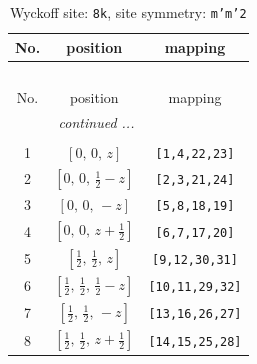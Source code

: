 \documentclass[fleqn,8pt]{jsarticle}
\begin{document}
\begin{longtable}{ccc}
\caption{Wyckoff site: {\tt 8k}, site symmetry: {\tt m'm'2}}
 \\
 \hline \hline
No. & position & mapping \\ \hline \endfirsthead

\multicolumn{2}{l}{\tablename\ \thetable{}} \\
 \hline \hline
No. & position & mapping \\ \hline \endhead

 \hline \hline
\multicolumn{2}{r}{\footnotesize\it continued ...} \\ \endfoot

 \hline \hline
\multicolumn{2}{r}{} \\ \endlastfoot

1 & $\left[ 0,\, 0,\, z \right]$ & {\tt [1,4,22,23]} \\ \hline
2 & $\left[ 0,\, 0,\, \frac{1}{2} - z \right]$ & {\tt [2,3,21,24]} \\ \hline
3 & $\left[ 0,\, 0,\, - z \right]$ & {\tt [5,8,18,19]} \\ \hline
4 & $\left[ 0,\, 0,\, z + \frac{1}{2} \right]$ & {\tt [6,7,17,20]} \\ \hline
5 & $\left[ \frac{1}{2},\, \frac{1}{2},\, z \right]$ & {\tt [9,12,30,31]} \\ \hline
6 & $\left[ \frac{1}{2},\, \frac{1}{2},\, \frac{1}{2} - z \right]$ & {\tt [10,11,29,32]} \\ \hline
7 & $\left[ \frac{1}{2},\, \frac{1}{2},\, - z \right]$ & {\tt [13,16,26,27]} \\ \hline
8 & $\left[ \frac{1}{2},\, \frac{1}{2},\, z + \frac{1}{2} \right]$ & {\tt [14,15,25,28]} \\
\end{longtable}
\renewcommand{\arraystretch}{1.2}
\end{document}
